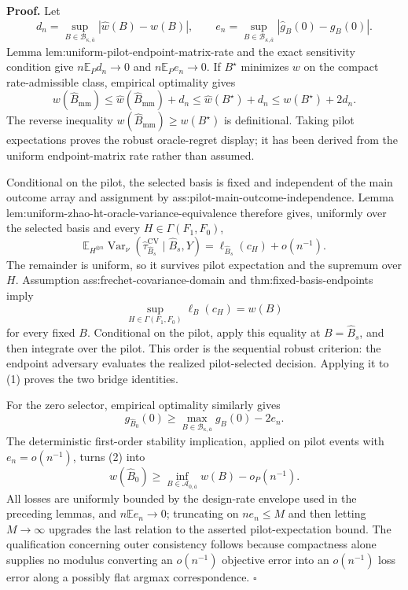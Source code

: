 \textbf{Proof.}
Let
\[
d_n=\sup_{B\in\mathcal B_{\kappa,\overline a}}|\widehat w(B)-w(B)|,
\qquad
e_n=\sup_{B\in\mathcal B_{\kappa,\overline a}}|\widehat g_B(0)-g_B(0)|.
\]
Lemma lem:uniform-pilot-endpoint-matrix-rate and the exact sensitivity condition give \(n\mathbb E_Pd_n\to0\) and \(n\mathbb E_Pe_n\to0\).  If \(B^\star\) minimizes \(w\) on the compact rate-admissible class, empirical optimality gives
\[
w(\widehat B_{\mathrm{mm}})
\le\widehat w(\widehat B_{\mathrm{mm}})+d_n
\le\widehat w(B^\star)+d_n
\le w(B^\star)+2d_n.
\]
The reverse inequality \(w(\widehat B_{\mathrm{mm}})\ge w(B^\star)\) is definitional.  Taking pilot expectations proves the robust oracle-regret display; it has been derived from the uniform endpoint-matrix rate rather than assumed.

Conditional on the pilot, the selected basis is fixed and independent of the main outcome array and assignment by ass:pilot-main-outcome-independence.  Lemma lem:uniform-zhao-ht-oracle-variance-equivalence therefore gives, uniformly over the selected basis and every \(H\in\Gamma(F_1,F_0)\),
\[
\mathbb E_{H^{\otimes n}}
\operatorname{Var}_\nu
(\widehat\tau_{\widehat B_s}^{\mathrm{CV}}\mid\widehat B_s,Y)
=\ell_{\widehat B_s}(c_H)+o(n^{-1}). \tag{1}
\]
The remainder is uniform, so it survives pilot expectation and the supremum over \(H\).  Assumption ass:frechet-covariance-domain and thm:fixed-basis-endpoints imply
\[
\sup_{H\in\Gamma(F_1,F_0)}\ell_B(c_H)=w(B)
\]
for every fixed \(B\).  Conditional on the pilot, apply this equality at \(B=\widehat B_s\), and then integrate over the pilot.  This order is the sequential robust criterion: the endpoint adversary evaluates the realized pilot-selected decision.  Applying it to (1) proves the two bridge identities.

For the zero selector, empirical optimality similarly gives
\[
g_{\widehat B_0}(0)
\ge\max_{B\in\mathcal B_{\kappa,\overline a}}g_B(0)-2e_n. \tag{2}
\]
The deterministic first-order stability implication, applied on pilot events with \(e_n=o(n^{-1})\), turns (2) into
\[
w(\widehat B_0)
\ge\inf_{B\in\mathcal A_{0,\overline a}}w(B)-o_P(n^{-1}).
\]
All losses are uniformly bounded by the design-rate envelope used in the preceding lemmas, and \(n\mathbb E e_n\to0\); truncating on \(ne_n\le M\) and then letting \(M\to\infty\) upgrades the last relation to the asserted pilot-expectation bound.  The qualification concerning outer consistency follows because compactness alone supplies no modulus converting an \(o(n^{-1})\) objective error into an \(o(n^{-1})\) loss error along a possibly flat argmax correspondence. \(\square\)
